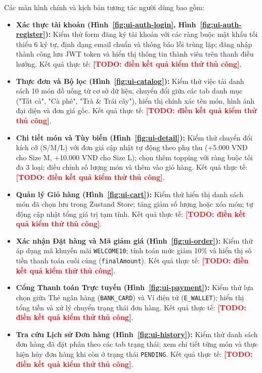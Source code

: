 \documentclass[12pt,a4paper,oneside]{report}
\newcommand{\todo}[1]{\textcolor{red}{\textbf{[TODO: #1]}}}
\begin{document}
Các màn hình chính và kịch bản tương tác người dùng bao gồm:
\begin{itemize}
    \item \textbf{Xác thực tài khoản (Hình~\ref{fig:ui-auth-login}, Hình~\ref{fig:ui-auth-register}):} Kiểm thử form đăng ký tài khoản với các ràng buộc mật khẩu tối thiểu 6 ký tự, định dạng email chuẩn và thông báo lỗi trùng lặp; đăng nhập thành công lưu JWT token và hiển thị thông tin thành viên trên thanh điều hướng. Kết quả thực tế: \todo{điền kết quả kiểm thử thủ công}.
    \item \textbf{Thực đơn và Bộ lọc (Hình~\ref{fig:ui-catalog}):} Kiểm thử việc tải danh sách 10 món đồ uống từ cơ sở dữ liệu, chuyển đổi giữa các tab danh mục ("Tất cả", "Cà phê", "Trà \& Trái cây"), hiển thị chính xác tên món, hình ảnh đại diện và đơn giá gốc. Kết quả thực tế: \todo{điền kết quả kiểm thử thủ công}.
    \item \textbf{Chi tiết món và Tùy biến (Hình~\ref{fig:ui-detail}):} Kiểm thử chuyển đổi kích cỡ (S/M/L) với đơn giá cập nhật tự động theo phụ thu (+5.000 VNĐ cho Size M, +10.000 VNĐ cho Size L); chọn thêm topping với ràng buộc tối đa 3 loại; điều chỉnh số lượng món và thêm vào giỏ hàng. Kết quả thực tế: \todo{điền kết quả kiểm thử thủ công}.
    \item \textbf{Quản lý Giỏ hàng (Hình~\ref{fig:ui-cart}):} Kiểm thử hiển thị danh sách món đã chọn lưu trong Zustand Store; tăng giảm số lượng hoặc xóa món; tự động cập nhật tổng giá trị tạm tính. Kết quả thực tế: \todo{điền kết quả kiểm thử thủ công}.
    \item \textbf{Xác nhận Đặt hàng và Mã giảm giá (Hình~\ref{fig:ui-order}):} Kiểm thử áp dụng mã khuyến mãi \texttt{WELCOME10}; tính toán mức giảm 10\% và hiển thị số tiền thanh toán cuối cùng (\texttt{finalAmount}). Kết quả thực tế: \todo{điền kết quả kiểm thử thủ công}.
    \item \textbf{Cổng Thanh toán Trực tuyến (Hình~\ref{fig:ui-payment}):} Kiểm thử lựa chọn giữa Thẻ ngân hàng (\texttt{BANK\_CARD}) và Ví điện tử (\texttt{E\_WALLET}); hiển thị tổng tiền và xử lý chuyển trạng thái đơn hàng. Kết quả thực tế: \todo{điền kết quả kiểm thử thủ công}.
    \item \textbf{Tra cứu Lịch sử Đơn hàng (Hình~\ref{fig:ui-history}):} Kiểm thử danh sách đơn hàng đã đặt phân theo các tab trạng thái; xem chi tiết từng món và thực hiện hủy đơn hàng khi còn ở trạng thái \texttt{PENDING}. Kết quả thực tế: \todo{điền kết quả kiểm thử thủ công}.
\end{itemize}
\end{document}
